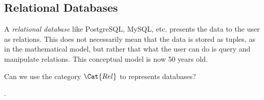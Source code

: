%
%
%


\subsection{Relational Databases}
\label{def:relational-databases}

A \emph{relational database} like PostgreSQL, MySQL, etc. presents 
the data to the user as relations. This does not necessarily mean
that the data is stored as tuples, as in the mathematical model, but 
rather that what the user can do is query and manipulate relations.
This conceptual model is now 50 years old.

Can we use the category $\Cat{Rel}$ to represents databases? 

.

